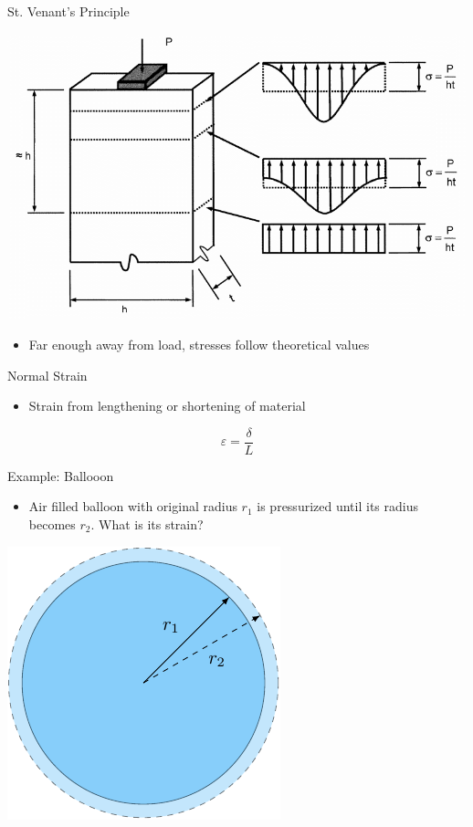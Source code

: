 \documentclass[10pt, svgnames]{beamer}
\begin{document}
\begin{frame}[label={sec:orgd123106}]{St. Venant's Principle}
\begin{center}
\includegraphics[width=.9\linewidth]{pictures/st-venant.png}
\end{center}

\begin{itemize}
\item Far enough away from load, stresses follow theoretical values
\end{itemize}
\end{frame}

\begin{frame}[label={sec:org8e17799}]{Normal Strain}
\begin{itemize}
\item Strain from lengthening or shortening of material
\end{itemize}

\[\varepsilon = \frac{\delta}{L}\]
\end{frame}

\begin{frame}[label={sec:org2a15eb0}]{Example: Ballooon}
\begin{itemize}
\item Air filled balloon with original radius \(r_1\) is pressurized until
its radius becomes \(r_2\). What is its strain?
\end{itemize}

\begin{center}
\includegraphics[height=0.6\textheight]{pictures/balloon-example.pdf}
\end{center}
\end{frame}
\end{document}
